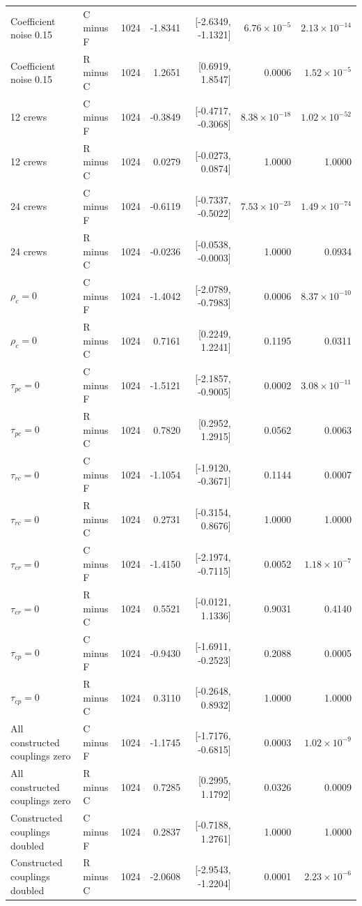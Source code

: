 \begin{longtable}{@{}llrrrrr@{}}
Coefficient noise 0.15 & C minus F & 1024 & -1.8341 & [-2.6349, -1.1321] & $6.76\times10^{-5}$ & $2.13\times10^{-14}$ \\
Coefficient noise 0.15 & R minus C & 1024 & 1.2651 & [0.6919, 1.8547] & 0.0006 & $1.52\times10^{-5}$ \\
12 crews & C minus F & 1024 & -0.3849 & [-0.4717, -0.3068] & $8.38\times10^{-18}$ & $1.02\times10^{-52}$ \\
12 crews & R minus C & 1024 & 0.0279 & [-0.0273, 0.0874] & 1.0000 & 1.0000 \\
24 crews & C minus F & 1024 & -0.6119 & [-0.7337, -0.5022] & $7.53\times10^{-23}$ & $1.49\times10^{-74}$ \\
24 crews & R minus C & 1024 & -0.0236 & [-0.0538, -0.0003] & 1.0000 & 0.0934 \\
$\rho_c=0$ & C minus F & 1024 & -1.4042 & [-2.0789, -0.7983] & 0.0006 & $8.37\times10^{-10}$ \\
$\rho_c=0$ & R minus C & 1024 & 0.7161 & [0.2249, 1.2241] & 0.1195 & 0.0311 \\
$\tau_{pc}=0$ & C minus F & 1024 & -1.5121 & [-2.1857, -0.9005] & 0.0002 & $3.08\times10^{-11}$ \\
$\tau_{pc}=0$ & R minus C & 1024 & 0.7820 & [0.2952, 1.2915] & 0.0562 & 0.0063 \\
$\tau_{rc}=0$ & C minus F & 1024 & -1.1054 & [-1.9120, -0.3671] & 0.1144 & 0.0007 \\
$\tau_{rc}=0$ & R minus C & 1024 & 0.2731 & [-0.3154, 0.8676] & 1.0000 & 1.0000 \\
$\tau_{cr}=0$ & C minus F & 1024 & -1.4150 & [-2.1974, -0.7115] & 0.0052 & $1.18\times10^{-7}$ \\
$\tau_{cr}=0$ & R minus C & 1024 & 0.5521 & [-0.0121, 1.1336] & 0.9031 & 0.4140 \\
$\tau_{cp}=0$ & C minus F & 1024 & -0.9430 & [-1.6911, -0.2523] & 0.2088 & 0.0005 \\
$\tau_{cp}=0$ & R minus C & 1024 & 0.3110 & [-0.2648, 0.8932] & 1.0000 & 1.0000 \\
All constructed couplings zero & C minus F & 1024 & -1.1745 & [-1.7176, -0.6815] & 0.0003 & $1.02\times10^{-9}$ \\
All constructed couplings zero & R minus C & 1024 & 0.7285 & [0.2995, 1.1792] & 0.0326 & 0.0009 \\
Constructed couplings doubled & C minus F & 1024 & 0.2837 & [-0.7188, 1.2761] & 1.0000 & 1.0000 \\
Constructed couplings doubled & R minus C & 1024 & -2.0608 & [-2.9543, -1.2204] & 0.0001 & $2.23\times10^{-6}$ \\

\end{longtable}

